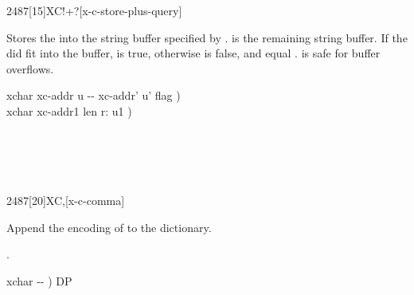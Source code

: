 \vspace*{-4ex}
\begin{worddef}[XC!+q]{2487}[15]{XC!+?}[x-c-store-plus-query]%
\item {}

	Stores the  into the string buffer specified by
	.   is the remaining string
	buffer.  If the  did fit into the buffer, 
	is true, otherwise  is false, and 
	equal .   is safe for buffer overflows.

	\begin{implement} %
	\word{:}   xchar xc-addr u -{}- xc-addr' u' flag ) \\
	\tab {}        xchar xc-addr1 len r: u1 ) \\
	\tab[2]   \\
	\tab[2]     \\
	\tab {} \\
	\tab[2]      \word{-}  \\
	\tab {} \word{;}
	\end{implement}

	\begin{testing} %
	\end{testing}
\end{worddef}

\vspace*{-2ex}
\begin{worddef}{2487}[20]{XC,}[x-c-comma]%
\item {}

	Append the encoding of  to the dictionary.

\see {}.

	\begin{implement} %
	\word{:}   xchar -{}- )   DP \word{!} \word{;}
	\end{implement}
\end{worddef}

